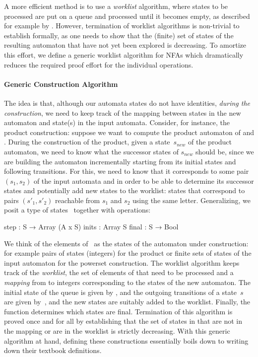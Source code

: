 A more efficient method is to use a \emph{worklist} algorithm, where states to
be processed are put on a queue and processed until it becomes empty, as
described for example by \citet{esparza2023automata}.
%
However, termination of worklist algorithms is non-trivial to establish
formally, as one needs to show that the (finite) set of states of the resulting
automaton that have not yet been explored is decreasing.
%
To amortize this effort, we define a generic worklist algorithm for NFAs which
dramatically reduces the required proof effort for the individual operations.

\paragraph{Generic Construction Algorithm}
The idea is that, although our automata states do not have identities,
\emph{during the construction}, we need to keep track of the mapping between
states in the new automaton and state(s) in the input automata.
%
Consider, for instance, the product construction: suppose we want to compute the
product automaton of  and .
%
During the construction of the product, given a state~$s_{\mathit{new}}$ of the
product automaton, we need to know what the successor states of
$s_{\mathit{new}}$ should be, since we are building the automaton incrementally
starting from its initial states and following transitions.
%
For this, we need to know that it corresponds to some pair $(s_1, s_2)$ of the
input automata  and  in order to be able to
determine its successor states and potentially add new states to the worklist:
states that correspond to pairs $(s'_1, s'_2)$ reachable from $s_1$ and
$s_2$ using the same letter.
%
Generalizing, we posit a type of states~ together with operations:
%
\begin{lean}
  step  : S → Array (A x S)
  inits : Array S
  final : S → Bool
\end{lean}

We think of the elements of~ as the states of the automaton under
construction: for example pairs of states (integers) for the product or finite
sets of states of the input automaton for the powerset construction.
%
The worklist algorithm keeps track of the \emph{worklist}, the set of elements
of  that need to be processed and a \emph{mapping} from
 to integers corresponding to the states of the new automaton.
%
The initial state of the queue is given by , and the outgoing
transitions of a state~$s$ are given by~, and the new states
are suitably added to the worklist. Finally, the  function
determines which states are final.
%
Termination of this algorithm is proved once and for all by establishing that
the set of states in  that are not in the mapping or are in the
worklist is strictly decreasing.
%
With this generic algorithm at hand, defining these constructions essentially
boils down to writing down their textbook definitions.

